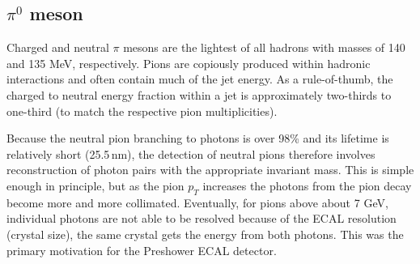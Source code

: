\subsection{$\pi^{0}$ meson}

Charged and neutral $\pi$ mesons are the lightest of all hadrons with masses of 140 and 135 MeV, respectively. Pions are copiously produced within hadronic interactions and often contain much of the jet energy. As a rule-of-thumb, the charged to neutral energy fraction within a jet is approximately two-thirds to one-third (to match the respective pion multiplicities).

Because the neutral pion branching to photons is over 98\% and its lifetime is relatively short (25.5$\,$nm), the detection of neutral pions therefore involves reconstruction of photon pairs with the appropriate invariant mass. This is simple enough in principle, but as the pion $p_{T}$ increases the photons from the pion decay become more and more collimated. Eventually, for pions above about 7 GeV, individual photons are not able to be resolved because of the ECAL resolution (crystal size), the same crystal gets the energy from both photons. This was the primary motivation for the Preshower ECAL detector.
